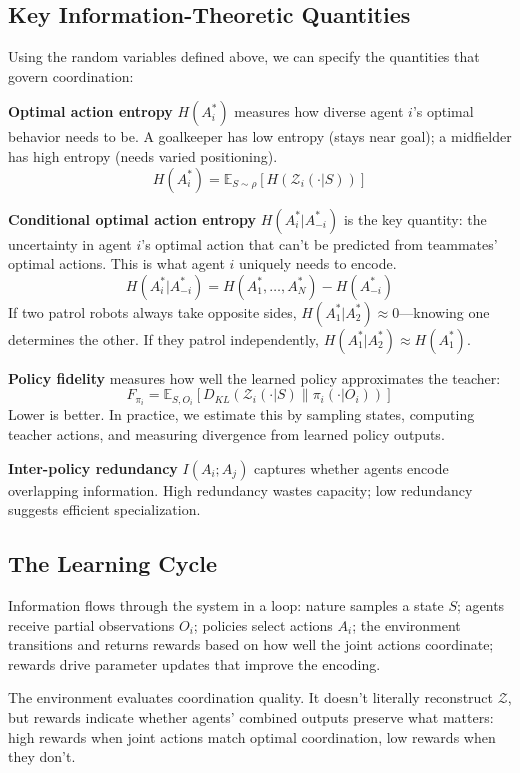 \documentclass[10pt, letterpaper]{article}
\begin{document}
\subsection{Key Information-Theoretic Quantities}

Using the random variables defined above, we can specify the quantities that govern coordination:

\textbf{Optimal action entropy} $H(A_i^*)$ measures how diverse agent $i$'s optimal behavior needs to be. A goalkeeper has low entropy (stays near goal); a midfielder has high entropy (needs varied positioning).
\[H(A_i^*) = \mathbb{E}_{S \sim \rho} \left[ H(\mathcal{Z}_i(\cdot|S)) \right]\]

\textbf{Conditional optimal action entropy} $H(A_i^*|A_{-i}^*)$ is the key quantity: the uncertainty in agent $i$'s optimal action that can't be predicted from teammates' optimal actions. This is what agent $i$ uniquely needs to encode.
\[H(A_i^*|A_{-i}^*) = H(A_1^*, \ldots, A_N^*) - H(A_{-i}^*)\]
If two patrol robots always take opposite sides, $H(A_1^*|A_2^*) \approx 0$---knowing one determines the other. If they patrol independently, $H(A_1^*|A_2^*) \approx H(A_1^*)$.

\textbf{Policy fidelity} measures how well the learned policy approximates the teacher:
\[F_{\pi_i} = \mathbb{E}_{S, O_i} \left[ D_{KL}(\mathcal{Z}_i(\cdot|S) \| \pi_i(\cdot|O_i)) \right]\]
Lower is better. In practice, we estimate this by sampling states, computing teacher actions, and measuring divergence from learned policy outputs.

\textbf{Inter-policy redundancy} $I(A_i; A_j)$ captures whether agents encode overlapping information. High redundancy wastes capacity; low redundancy suggests efficient specialization.

\subsection{The Learning Cycle}

Information flows through the system in a loop: nature samples a state $S$; agents receive partial observations $O_i$; policies select actions $A_i$; the environment transitions and returns rewards based on how well the joint actions coordinate; rewards drive parameter updates that improve the encoding.

The environment evaluates coordination quality. It doesn't literally reconstruct $\mathcal{Z}$, but rewards indicate whether agents' combined outputs preserve what matters: high rewards when joint actions match optimal coordination, low rewards when they don't.
\end{document}
